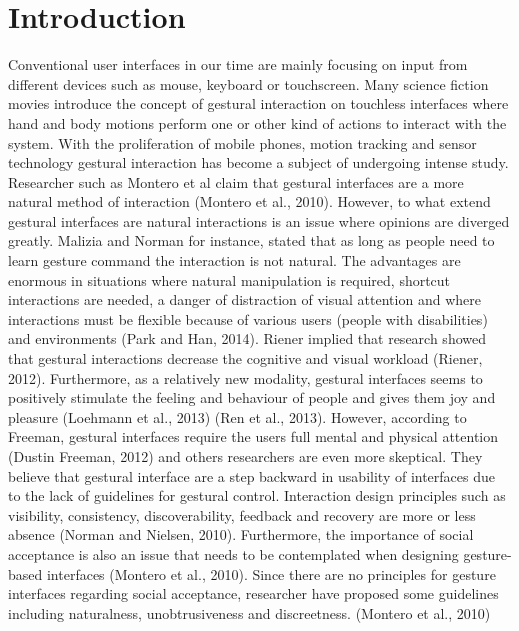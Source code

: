 \chapter{Introduction}
\label{chap:introduction}

Conventional user interfaces in our time are mainly focusing on input from different devices such as mouse, keyboard or touchscreen. Many science fiction movies introduce the concept of gestural interaction on touchless interfaces where hand and body motions perform one or other kind of actions to interact with the system. With the proliferation of mobile phones, motion tracking and sensor technology gestural interaction has become a subject of undergoing intense study. Researcher such as Montero et al claim that gestural interfaces are a more natural method of interaction (Montero et al., 2010). However, to what extend gestural interfaces are natural interactions is an issue where opinions are diverged greatly. Malizia and Norman for instance, stated that as long as people need to learn gesture command the interaction is not natural. The advantages are enormous in situations where natural manipulation is required, shortcut interactions are needed, a danger of distraction of visual attention and where interactions must be flexible because of various users (people with disabilities) and environments (Park and Han, 2014). Riener implied that research showed that gestural interactions decrease the cognitive and visual workload (Riener, 2012). Furthermore, as a relatively new modality, gestural interfaces seems to positively stimulate the feeling and behaviour of people and gives them joy and pleasure (Loehmann et al., 2013) (Ren et al., 2013). However, according to Freeman, gestural interfaces require the users full mental and physical attention (Dustin Freeman, 2012) and others researchers are even more skeptical. They believe that gestural interface are a step backward in usability of interfaces due to the lack of guidelines for gestural control. Interaction design principles such as visibility, consistency, discoverability, feedback and recovery are more or less absence  (Norman and Nielsen, 2010). Furthermore, the importance of social acceptance is also an issue that needs to be contemplated when designing gesture-based interfaces (Montero et al., 2010). Since there are no principles for gesture interfaces regarding social acceptance, researcher have proposed some guidelines including naturalness, unobtrusiveness and discreetness. (Montero et al., 2010) 


